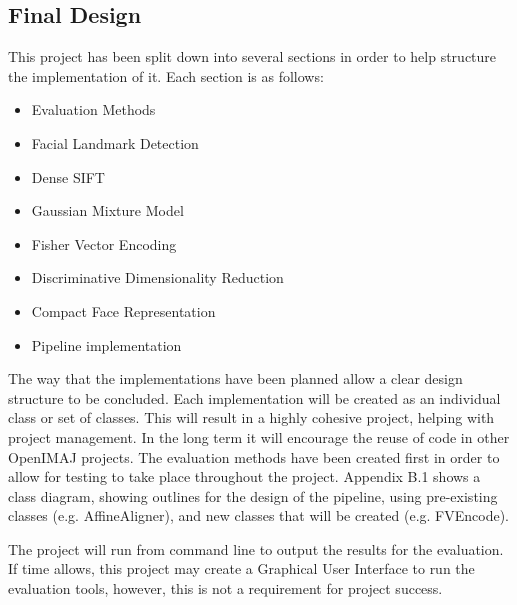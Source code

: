 \documentclass[12pt, a4paper]{article}
\begin{document}
\subsection{Final Design}
This project has been split down into several sections in order to help structure the implementation of it. Each section is as follows:
\begin{itemize}
\item Evaluation Methods
\item Facial Landmark Detection
\item Dense SIFT
\item Gaussian Mixture Model
\item Fisher Vector Encoding
\item Discriminative Dimensionality Reduction
\item Compact Face Representation
\item Pipeline implementation
\end{itemize}
The way that the implementations have been planned allow a clear design structure to be concluded. Each implementation will be created as an individual class or set of classes. This will result in a highly cohesive project, helping with project management. In the long term it will encourage the reuse of code in other OpenIMAJ projects. The evaluation methods have been created first in order to allow for testing to take place throughout the project. Appendix B.1 shows a class diagram, showing outlines for the design of the pipeline, using pre-existing classes (e.g. AffineAligner), and new classes that will be created (e.g. FVEncode).

The project will run from command line to output the results for the evaluation. If time allows, this project may create a Graphical User Interface to run the evaluation tools, however, this is not a requirement for project success.
\end{document}
